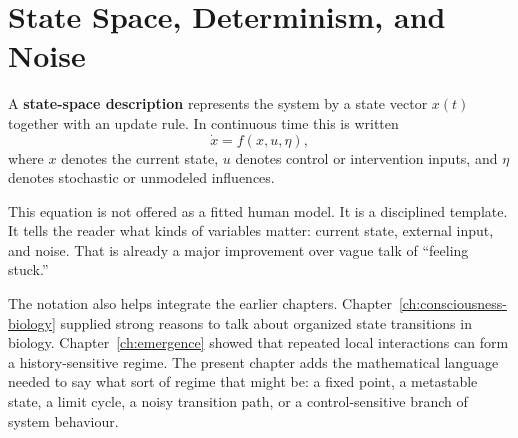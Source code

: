 \section{State Space, Determinism, and Noise}

\begin{definition}
A \textbf{state-space description} represents the system by a state vector
$x(t)$ together with an update rule. In continuous time this is written
\[
  \dot{x} = f(x,u,\eta),
\]
where $x$ denotes the current state, $u$ denotes control or intervention
inputs, and $\eta$ denotes stochastic or unmodeled influences.
\end{definition}

\begin{remark}
This equation is not offered as a fitted human model. It is a disciplined
template. It tells the reader what kinds of variables matter: current state,
external input, and noise. That is already a major improvement over vague talk
of ``feeling stuck.''
\end{remark}

The notation also helps integrate the earlier chapters. Chapter~\ref{ch:consciousness-biology}
supplied strong reasons to talk about organized state transitions in biology.
Chapter~\ref{ch:emergence} showed that repeated local interactions can form a
history-sensitive regime. The present chapter adds the mathematical language
needed to say what sort of regime that might be: a fixed point, a metastable
state, a limit cycle, a noisy transition path, or a control-sensitive branch of
system behaviour.

